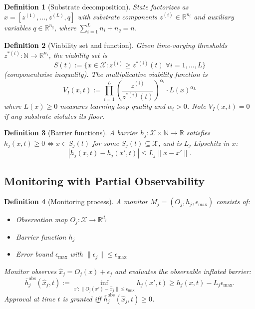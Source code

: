 \documentclass[11pt,a4paper]{article}
\newtheorem{definition}{Definition}
\begin{document}
\begin{definition}[Substrate decomposition]
\label{def:substrate}
State factorizes as $x = [z^{(1)}, \ldots, z^{(L)}, q]$ with substrate components $z^{(i)} \in \mathbb{R}^{n_i}$ and auxiliary variables $q \in \mathbb{R}^{n_q}$, where $\sum_{i=1}^L n_i + n_q = n$.
\end{definition}

\begin{definition}[Viability set and function]
\label{def:viability}
Given time-varying thresholds $z^{*(i)}: \mathbb{N} \to \mathbb{R}^{n_i}$, the viability set is
$$S(t) := \{x \in \mathcal{X}: z^{(i)} \geq z^{*(i)}(t) \;\forall i=1,\ldots,L\}$$
(componentwise inequality). The multiplicative viability function is
$$V_I(x,t) := \prod_{i=1}^L \left(\frac{z^{(i)}}{z^{*(i)}(t)}\right)^{\alpha_i} \cdot L(x)^{\alpha_L}$$
where $L(x) \geq 0$ measures learning loop quality and $\alpha_i > 0$. Note $V_I(x,t) = 0$ if any substrate violates its floor.
\end{definition}

\begin{definition}[Barrier functions]
\label{def:barrier}
A barrier $h_j: \mathcal{X} \times \mathbb{N} \to \mathbb{R}$ satisfies $h_j(x,t) \geq 0 \Leftrightarrow x \in S_j(t)$ for some $S_j(t) \subseteq \mathcal{X}$, and is $L_j$-Lipschitz in $x$:
$$|h_j(x,t) - h_j(x',t)| \leq L_j \|x - x'\|.$$
\end{definition}

\subsection{Monitoring with Partial Observability}

\begin{definition}[Monitoring process]
\label{def:monitor}
A monitor $M_j = (O_j, h_j, \epsilon_{\max})$ consists of:
\begin{itemize}
\item Observation map $O_j: \mathcal{X} \to \mathbb{R}^{d_j}$
\item Barrier function $h_j$
\item Error bound $\epsilon_{\max}$ with $\|\epsilon_j\| \leq \epsilon_{\max}$
\end{itemize}
Monitor observes $\hat{x}_j = O_j(x) + \epsilon_j$ and evaluates the \emph{observable inflated barrier}:
$$\bar{h}_j^{\text{obs}}(\hat{x}_j, t) := \inf_{x': \|O_j(x') - \hat{x}_j\| \leq \epsilon_{\max}} h_j(x',t) \geq h_j(x,t) - L_j \epsilon_{\max}.$$
Approval at time $t$ is granted iff $\bar{h}_j^{\text{obs}}(\hat{x}_j, t) \geq 0$.
\end{definition}
\end{document}
